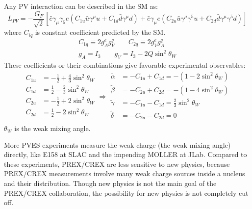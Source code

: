Any PV interaction can be described in the SM as:
\begin{equation}
    L_{PV}  = -\frac{G_F}{\sqrt{2}}\left[ 
	\bar{e}\gamma_\mu\gamma_5 e (C_{1u}\bar{u}\gamma^\mu u + C_{1d}\bar{d}\gamma^\mu d)
      + \bar{e}\gamma_\mu e (C_{2u}\bar{u}\gamma^\mu\gamma^5 u + C_{2d}\bar{d}\gamma^\mu \gamma^5d)
	\right]
\end{equation}
where $C_{iq}$ is constant coefficient predicted by the SM. 
\begin{equation}
    \begin{gathered}
	C_{1q} \equiv 2g_A^e g_V^q	\qquad C_{2q} \equiv 2g_V^e g_A^q   \\
	g_A = I_3   \qquad g_V = I_3 - 2Q\sin^2\theta_W
    \end{gathered}
\end{equation}
These coefficients or their combinations give favorable experimental observables:
\begin{equation}
    \begin{aligned}
	C_{1u} &= -\frac{1}{2} + \frac{4}{3}\sin^2\theta_W   \\
	C_{1d} &= \frac{1}{2} - \frac{2}{3}\sin^2\theta_W   \\
	C_{2u} &= -\frac{1}{2} + 2\sin^2\theta_W   \\
	C_{2d} &= \frac{1}{2} - 2\sin^2\theta_W   \\
    \end{aligned}
    \Longrightarrow
    \begin{aligned}
	\tilde{\alpha} &= -C_{1u} + C_{1d} = -(1-2\sin^2\theta_W)	\\
	\tilde{\beta} &= -C_{2u} + C_{2d} = -(1-4\sin^2\theta_W)	\\
	\tilde{\gamma} &= -C_{1u} - C_{1d} = \frac{2}{3}\sin^2\theta_W	\\
	\tilde{\delta} &= -C_{2u} - C_{2d} = 0	\\
    \end{aligned}
\end{equation}
$\theta_W$ is the weak mixing angle.

More PVES experiments measure the weak charge (the weak mixing angle) directly, like
E158 at SLAC and the impending MOLLER at JLab. Compared to these experiments, PREX/CREX
are less sensitive to new physics, because PREX/CREX measurements involve many 
weak charge sources inside a nucleus and their distribution. Though new physics
is not the main goal of the PREX/CREX collaboration, the possibility for new physics 
is not completely cut off.

